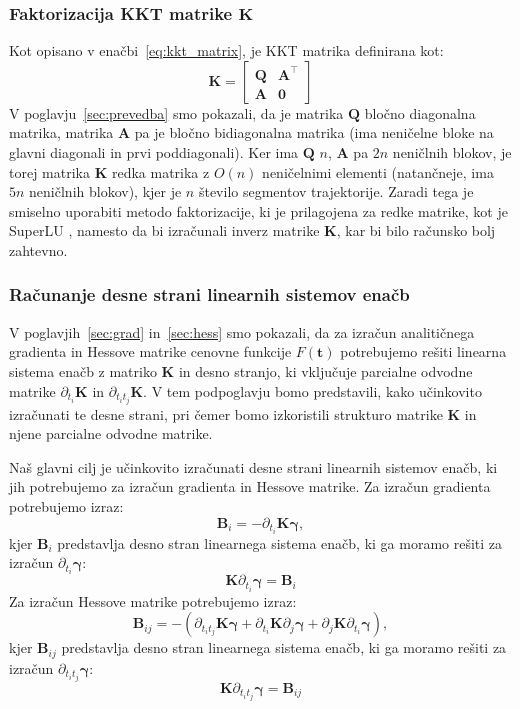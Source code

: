 \documentclass[mat2, tisk]{fmfdelo}
\newcommand{\yimplicit}{\mathbf{\gamma}}
\newcommand{\qmat}{\mathbf{Q}}
\newcommand{\amat}{\mathbf{A}}
\newcommand{\kmat}{\mathbf{K}}
\newcommand{\tvec}{\mathbf{t}}
\begin{document}
\subsubsection{Faktorizacija KKT matrike $\kmat$}
Kot opisano v enačbi~\eqref{eq:kkt_matrix}, je KKT matrika definirana kot:
\begin{equation}
    \kmat = \begin{bmatrix}
        \qmat & \amat^{\top} \\
        \amat & \mathbf{0}
    \end{bmatrix}
\end{equation}
V poglavju~\ref{sec:prevedba} smo pokazali, da je matrika $\qmat$ bločno diagonalna matrika, matrika $\amat$ pa je bločno bidiagonalna matrika (ima neničelne bloke na glavni diagonali in prvi poddiagonali). Ker ima $\qmat$ $n$, $\amat$ pa $2n$ neničlnih blokov, je torej matrika $\kmat$ redka matrika z $O(n)$ neničelnimi elementi (natančneje, ima $5n$ neničlnih blokov), kjer je $n$ število segmentov trajektorije. Zaradi tega je smiselno uporabiti metodo faktorizacije, ki je prilagojena za redke matrike, kot je SuperLU \cite{superlu1997superlu}, namesto da bi izračunali inverz matrike $\kmat$, kar bi bilo računsko bolj zahtevno.

\subsubsection{Računanje desne strani linearnih sistemov enačb}

V poglavjih~\ref{sec:grad} in~\ref{sec:hess} smo pokazali, da za izračun analitičnega gradienta in Hessove matrike cenovne funkcije $F(\tvec)$ potrebujemo rešiti linearna sistema enačb z matriko $\kmat$ in desno stranjo, ki vključuje parcialne odvodne matrike $\partial_{t_i}\kmat$ in $\partial_{t_it_j}\kmat$. V tem podpoglavju bomo predstavili, kako učinkovito izračunati te desne strani, pri čemer bomo izkoristili strukturo matrike $\kmat$ in njene parcialne odvodne matrike.

Naš glavni cilj je učinkovito izračunati desne strani linearnih sistemov enačb, ki jih potrebujemo za izračun gradienta in Hessove matrike. Za izračun gradienta potrebujemo izraz:
\begin{equation}
\mathbf{B}_i = - \partial_{t_i}\kmat \yimplicit,
\end{equation}
kjer $\mathbf{B}_i$ predstavlja desno stran linearnega sistema enačb, ki ga moramo rešiti za izračun $\partial_{t_i} \yimplicit$:
\begin{equation}
\kmat \partial_{t_i} \yimplicit = \mathbf{B}_i
\end{equation}
Za izračun Hessove matrike potrebujemo izraz:
\begin{equation}
\mathbf{B}_{ij} = - (\partial_{t_it_j} \mathbf{K} \yimplicit
    + \partial_{t_i} \mathbf{K} \partial_j\yimplicit
    + \partial_j \mathbf{K} \partial_{t_i}\yimplicit),
\end{equation}
kjer $\mathbf{B}_{ij}$ predstavlja desno stran linearnega sistema enačb, ki ga moramo rešiti za izračun $\partial_{t_it_j} \yimplicit$:
\begin{equation}
\kmat \partial_{t_it_j}\yimplicit = \mathbf{B}_{ij}
\end{equation}
\end{document}
